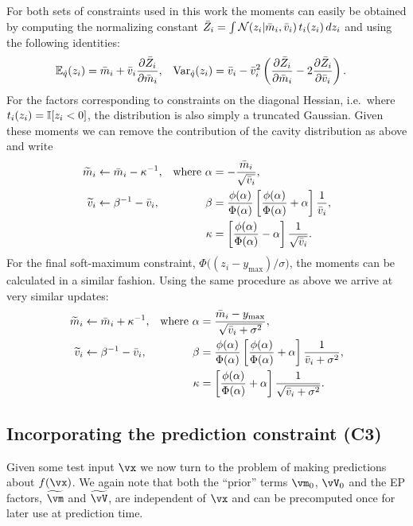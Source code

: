 For both sets of constraints used in this work the moments can easily be
obtained by computing the normalizing constant $\bar Z_{i} = \int
\mathcal{N}(z_i|\bar m_{i},\bar v_{i}) \,t_i(z_i) \,dz_i$ and using the following identities:
\begin{align*}
    \mathbb{E}_{\hat q}(z_i)
    &= \bar m_{i} + \bar v_{i} \frac{\partial\bar Z_{i}}{\partial\bar m_{i}},
    &
    \textrm{Var}_{\hat q}(z_i)
    &= \bar v_{i} - \bar v_{i}^2
    \left(
    \frac{\partial\bar Z_{i}}{\partial\bar m_{i}} 
    - 2\frac{\partial\bar Z_{i}}{\partial\bar v_{i}}\right).
\end{align*}
For the factors corresponding to constraints on the diagonal Hessian, i.e.\
where $t_i(z_i)=\mathbb{I}[z_i<0]$, the distribution is also simply a truncated
Gaussian.  Given these moments we can remove the contribution of the cavity
distribution as above and write
\begin{align*}
    \widetilde m_i &\gets \bar m_{i} - \kappa^{-1},
    &\text{where } 
      \alpha &= -\frac{\bar m_{i}}{\sqrt{\bar v_{i}}}, \\
    \widetilde v_i &\gets \beta^{-1} - \bar v_{i},
    & \beta &=
      \frac{\phi(\alpha)}{\Phi(\alpha)}\left[\frac{\phi(\alpha)}{\Phi(\alpha)} +
      \alpha\right] \frac1{\bar v_{i}}, \\
    &&
    \kappa &= \left[\frac{\phi(\alpha)}{\Phi(\alpha)}-\alpha\right]\frac1{\sqrt{\bar v_{i}}}.
\end{align*}
For the final soft-maximum constraint,
$\Phi\big((z_i-y_\mathrm{max})/\sigma\big)$, the moments can be calculated in a
similar fashion. Using the same procedure as above we arrive at very similar
updates:
\begin{align*}
    \widetilde m_i &\gets \bar m_{i} + \kappa^{-1},
    &\text{where } 
      \alpha &= \frac{\bar m_{i}-y_\mathrm{max}}{\sqrt{\bar v_{i}+\sigma^2}}, \\
    \widetilde v_i &\gets \beta^{-1} - \bar v_{i},
    & \beta &=
      \frac{\phi(\alpha)}{\Phi(\alpha)}\left[\frac{\phi(\alpha)}{\Phi(\alpha)} +
      \alpha\right] \frac1{\bar v_{i}+\sigma^2}, \\
    &&
    \kappa &= \left[\frac{\phi(\alpha)}{\Phi(\alpha)}+\alpha\right]\frac1{\sqrt{\bar v_{i}+\sigma^2}}.
\end{align*}

\subsection{Incorporating the prediction constraint (C3)}

Given some test input $\x$ we now turn to the problem of making predictions
about $f(\x)$. We again note that both the ``prior'' terms $\vm_0$, $\vV_0$ and
the EP factors, $\widetilde\vm$ and $\widetilde\vV$, are independent
of $\x$ and can be precomputed once for later use at prediction time. 

